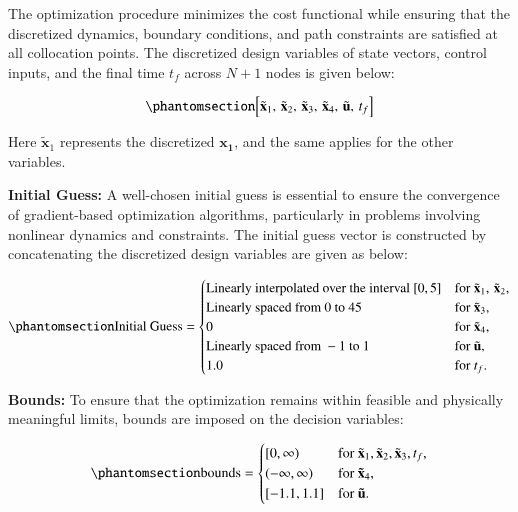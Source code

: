 \documentclass[
  number,
  preprint]{elsarticle}
\begin{document}
The optimization procedure minimizes the cost functional while ensuring
that the discretized dynamics, boundary conditions, and path constraints
are satisfied at all collocation points. The discretized design
variables of state vectors, control inputs, and the final time \(t_f\)
across \(N+1\) nodes is given below:

\begin{equation}\protect\phantomsection\label{eq-ch2-design-variables}{
\left[ \tilde{\mathbf{x}}_1,\, \tilde{\mathbf{x}}_2,\, \tilde{\mathbf{x}}_3,\, \tilde{\mathbf{x}}_4,\, \tilde{\mathbf{u}},\, t_f \right]
}\end{equation}

Here \(\tilde{\mathbf{x}}_1\) represents the discretized
\(\mathbf{x_1}\), and the same applies for the other variables.

\textbf{Initial Guess:} A well-chosen initial guess is essential to
ensure the convergence of gradient-based optimization algorithms,
particularly in problems involving nonlinear dynamics and constraints.
The initial guess vector is constructed by concatenating the discretized
design variables are given as below:

\begin{equation}\protect\phantomsection\label{eq-ch2-initial-guess}{
\text{Initial Guess} =
\begin{cases}
\text{Linearly interpolated over the interval } [0, 5] & \text{for } \tilde{\mathbf{x}}_1,\, \tilde{\mathbf{x}}_2, \\
\text{Linearly spaced from } 0 \text{ to } 45 & \text{for } \tilde{\mathbf{x}}_3, \\
0 & \text{for } \tilde{\mathbf{x}}_4, \\
\text{Linearly spaced from } -1 \text{ to } 1 & \text{for } \tilde{\mathbf{u}}, \\
1.0 & \text{for } t_f.
\end{cases}
}\end{equation}

\textbf{Bounds:} To ensure that the optimization remains within feasible
and physically meaningful limits, bounds are imposed on the decision
variables:

\begin{equation}\protect\phantomsection\label{eq-ch2-bounds-setup}{
\text{bounds} =
\begin{cases}
[0, \infty) & \text{for } \tilde{\mathbf{x}}_1, \tilde{\mathbf{x}}_2, \tilde{\mathbf{x}}_3, t_f, \\
(-\infty, \infty) & \text{for } \mathbf{\tilde{x}}_4, \\
[-1.1, 1.1] & \text{for } \mathbf{\tilde{u}}.
\end{cases}
}\end{equation}
\end{document}

